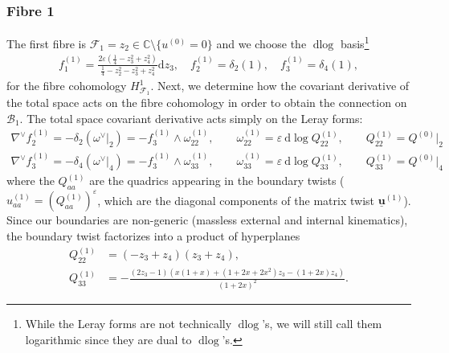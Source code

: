 \documentclass[11pt]{article}
\renewcommand{\d}{\text{d}}
\newcommand{\F}{\mathcal{F}}
\newcommand{\B}{\mathcal{B}}
\newcommand{\vep}{\varepsilon}
\newcommand{\mat}[1]{\underline{\boldsymbol{#1}}}
\begin{document}
\subsubsection{Fibre 1}
The first fibre is $\F_1 = z_2 \in \mathbb{C}\setminus\{u^{(0)}=0\}$ and we choose the $\d\log$ basis\footnote{While the Leray forms are not technically $\d\log$'s, we will still call them logarithmic since they are dual to $\d\log$'s.}
\begin{align} \label{eq:f1(1)}
	f_1^{(1)} 
	= \frac{2\vep (\frac{1}{4}-z_3^2+z_4^2)}{\frac{1}{4}-z_2^2-z_3^2+z_4^2} \d z_3,
	\quad
	f_2^{(1)} = \delta_2(1),
	\quad
	f_3^{(1)} = \delta_4(1),
\end{align}
for the fibre cohomology $H^1_{\F_1}$. Next, we determine how the covariant derivative of the total space acts on the fibre cohomology in order to obtain the connection on $\B_1$. The total space covariant derivative acts simply on the Leray forms:
\begin{align}
	\nabla^\vee f_2^{(1)} = -\delta_{2}(\omega^\vee \vert_2) 
	= -f_3^{(1)} \wedge \omega_{22}^{(1)},
	\qquad 
	\omega^{(1)}_{22} = \vep\ \d\log Q_{22}^{(1)},
	\qquad 
	Q^{(1)}_{22} = Q^{(0)}\vert_2
	\\
	\nabla^\vee f_3^{(1)} = -\delta_{4}(\omega^\vee \vert_4) 
		= -f_3^{(1)} \wedge \omega_{33}^{(1)},
	\qquad 
	\omega^{(1)}_{33} = \vep\ \d\log Q_{33}^{(1)},
	\qquad 
	Q^{(1)}_{33} = Q^{(0)}\vert_4
\end{align}
where the $Q_{aa}^{(1)}$ are the quadrics appearing in the boundary twists ($u^{(1)}_{aa} =  (Q_{aa}^{(1)})^\vep$, which are the diagonal components of the matrix twist $\mat{u}^{(1)}$). Since our boundaries are non-generic (massless external and internal kinematics), the boundary twist factorizes into a product of hyperplanes
\begin{align}
	Q_{22}^{(1)} &=  (-z_3 {+} z_4) (z_3 {+} z_4),
	\\
	Q_{33}^{(1)} &= 
	-\frac{
		(2z_3{-}1) (x(1{+}x) + (1{+}2x{+}2x^2) z_3 {-} (1{+}2x) z_4)
	}{(1+2x)^2}.
\end{align}
\end{document}
